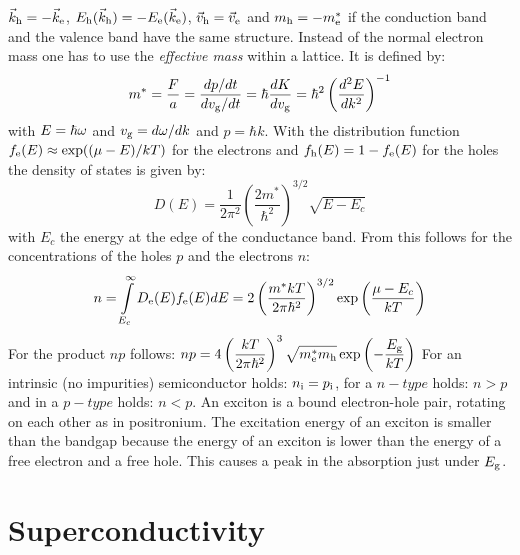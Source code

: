 \documentclass[twoside]{report}
\begin{document}
$\vec{k}_{\rm h}=-\vec{k}_{\rm e}$,
$E_{\rm h}(\vec{k}_{\rm h})=-E_{\rm e}(\vec{k}_{\rm e})$,
$\vec{v}_{\rm h}=\vec{v}_{\rm e}$ and $m_{\rm h}=-m_{\rm e}^*$ if the conduction band
and the valence band have the same structure.
\npar
Instead of the normal electron mass one has to use the {\it effective mass}
within a lattice. It is defined by:
\[
m^*=\frac{F}{a}=\frac{dp/dt}{dv_{\rm g}/dt}=\hbar\frac{dK}{dv_{\rm g}}=
\hbar^2\left(\frac{d^2E}{dk^2}\right)^{-1}
\]
with $E=\hbar\omega$ and $v_{\rm g}=d\omega/dk$ and $p=\hbar k$.
\npar
With the distribution function $f_{\rm e}(E)\approx\exp((\mu-E)/kT)$ for the
electrons and $f_{\rm h}(E)=1-f_{\rm e}(E)$ for the holes the density of
states is given by:
\[
D(E)=\frac{1}{2\pi^2}\left(\frac{2m^*}{\hbar^2}\right)^{3/2}\sqrt{E-E_c}
\]
with $E_c$ the energy at the edge of the conductance band. From this follows
for the concentrations of the holes $p$ and the electrons $n$:
\[
n=\int\limits_{E_c}^{\infty}D_{\rm e}(E)f_{\rm e}(E)dE=2\left(\frac{m^*kT}{2\pi\hbar^2}
\right)^{3/2}\exp\left(\frac{\mu-E_c}{kT}\right)
\]
For the product $np$ follows:
$\displaystyle np=4\left(\frac{kT}{2\pi\hbar^2}\right)^3
\sqrt{m^*_{\rm e}m_{\rm h}}\exp\left(-\frac{E_{\rm g}}{kT}\right)$
\npar
For an intrinsic (no impurities) semiconductor holds: $n_{\rm i}=p_{\rm i}$,
for a $n-type$ holds: $n>p$ and in a $p-type$ holds: $n<p$.
\npar
An exciton is a bound electron-hole pair, rotating on each other as in
positronium. The excitation energy of an exciton is smaller than the bandgap
because the energy of an exciton is lower than the energy of a free electron
and a free hole. This causes a peak in the absorption just under $E_{\rm g}$.

\section{Superconductivity}
\end{document}
